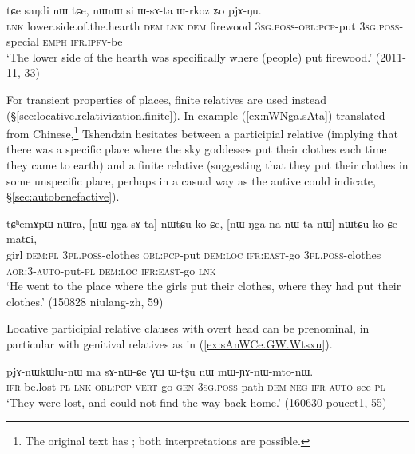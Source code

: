 \begin{exe}
\ex \label{ex:WsAta.Wrkoz}
\gll tɕe saŋdi nɯ tɕe, nɯnɯ si ɯ-sɤ-ta ɯ-rkoz ʑo pjɤ-ŋu. \\
  \textsc{lnk} lower.side.of.the.hearth \textsc{dem} \textsc{lnk} \textsc{dem} firewood \textsc{3sg}.\textsc{poss}-\textsc{obl}:\textsc{pcp}-put \textsc{3sg}.\textsc{poss}-special \textsc{emph} \textsc{ifr}.\textsc{ipfv}-be \\
\glt `The lower side of the hearth was specifically where (people) put firewood.' (2011-11, 33)
\end{exe}


For transient properties of places, finite relatives are used instead (§\ref{sec:locative.relativization.finite}). In example (\ref{ex:nWNga.sAta}) translated from Chinese,\footnote{The original text has ; both interpretations are possible. }  Tshendzin hesitates between a participial relative (implying that there was a specific place where the sky goddesses put their clothes each time they came to earth) and a finite relative (suggesting that they put their clothes in some unspecific place, perhaps in a casual way as the autive  could indicate, §\ref{sec:autobenefactive}).

\begin{exe}
\ex \label{ex:nWNga.sAta}
\gll tɕʰemɤpɯ nɯra, [nɯ-ŋga sɤ-ta] nɯtɕu ko-ɕe, [nɯ-ŋga na-nɯ-ta-nɯ] nɯtɕu ko-ɕe matɕi, \\
girl \textsc{dem}:\textsc{pl} \textsc{3pl}.\textsc{poss}-clothes \textsc{obl}:\textsc{pcp}-put \textsc{dem}:\textsc{loc} \textsc{ifr}:\textsc{east}-go \textsc{3pl}.\textsc{poss}-clothes \textsc{aor}:3\flobv{}-\textsc{auto}-put-\textsc{pl} \textsc{dem}:\textsc{loc} \textsc{ifr}:\textsc{east}-go \textsc{lnk} \\
\glt `He went to the place where the girls put their clothes, where they had put their clothes.' (150828 niulang-zh, 59)
\end{exe}

Locative participial relative clauses with overt head can be prenominal, in particular with genitival relatives as in (\ref{ex:sAnWCe.GW.Wtsxu}). 

\begin{exe}
\ex \label{ex:sAnWCe.GW.Wtsxu}
\gll  pjɤ-nɯkɯlu-nɯ ma sɤ-nɯ-ɕe ɣɯ ɯ-tʂu nɯ mɯ-ɲɤ-nɯ-mto-nɯ. \\
\textsc{ifr}-be.lost-\textsc{pl}  \textsc{lnk} \textsc{obl}:\textsc{pcp}-\textsc{vert}-go \textsc{gen} \textsc{3sg}.\textsc{poss}-path \textsc{dem} \textsc{neg}-\textsc{ifr}-\textsc{auto}-see-\textsc{pl} \\
\glt `They were lost, and could not find the way back home.' (160630 poucet1, 55)
\end{exe}


